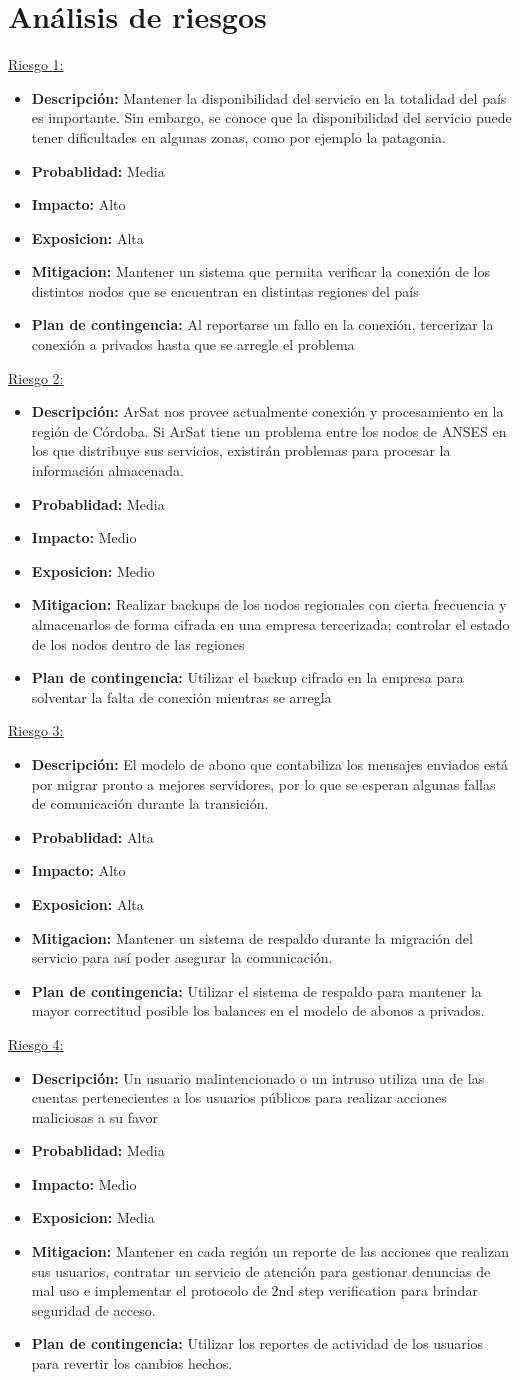 \documentclass[a4paper, 10pt, twoside]{article}
\newcommand{\riesgo}[7]{
	\underline{Riesgo {#1}:}
	\begin{itemize}		
		\item \textbf{Descripción:} {#2}
		\item \textbf{Probablidad:} {#3}
		\item \textbf{Impacto:} {#4}
		\item \textbf{Exposicion:} {#5}
		\item \textbf{Mitigacion:} {#6}
		\item \textbf{Plan de contingencia:} {#7}
	\end{itemize}
}
\begin{document}

\section{Análisis de riesgos}

\riesgo{1}
{Mantener la disponibilidad del servicio en la totalidad del país es importante. Sin embargo, se conoce que la disponibilidad del servicio puede tener dificultades en algunas zonas, como por ejemplo la patagonia.}
{Media}
{Alto}
{Alta}
{Mantener un sistema que permita verificar la conexión de los distintos nodos que se encuentran en distintas regiones del país}
{Al reportarse un fallo en la conexión, tercerizar la conexión a privados hasta que se arregle el problema}

\riesgo{2}
{ArSat nos provee actualmente conexión y procesamiento en la región de Córdoba. Si ArSat tiene un problema entre los nodos de ANSES en los que distribuye sus servicios, existirán problemas para procesar la información almacenada.}
{Media}
{Medio}
{Medio}
{Realizar backups de los nodos regionales con cierta frecuencia y almacenarlos de forma cifrada en una empresa tercerizada; controlar el estado de los nodos dentro de las regiones}
{Utilizar el backup cifrado en la empresa para solventar la falta de conexión mientras se arregla}

\riesgo{3}
{El modelo de abono que contabiliza los mensajes enviados está por migrar pronto a mejores servidores, por lo que se esperan algunas fallas de comunicación durante la transición.}
{Alta}
{Alto}
{Alta}
{Mantener un sistema de respaldo durante la migración del servicio para así poder asegurar la comunicación.}
{Utilizar el sistema de respaldo para mantener la mayor correctitud posible los balances en el modelo de abonos a privados.}

\riesgo{4}
{Un usuario malintencionado o un intruso utiliza una de las cuentas pertenecientes a los usuarios públicos para realizar acciones maliciosas a su favor}
{Media}
{Medio}
{Media}
{Mantener en cada región un reporte de las acciones que realizan sus usuarios, contratar un servicio de atención para gestionar denuncias de mal uso e implementar el protocolo de 2nd step verification para brindar seguridad de acceso.}
{Utilizar los reportes de actividad de los usuarios para revertir los cambios hechos.}

\newpage
\end{document}
